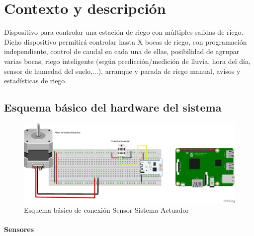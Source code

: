 \documentclass[12pt,a4paper,titlepage,oneside]{report}
\title{\titulo}
\author{\autor}
\begin{document}



\listoffigures

\chapter{Contexto y descripción}

	Dispositivo para controlar una estación de riego 
con múltiples salidas de riego. Dicho dispositivo 
permitirá controlar hasta X bocas de riego, con programación 
independiente, control de caudal en cada una de ellas, posibilidad 
de agrupar varias bocas, riego inteligente (según predicción/medición 
de lluvia, hora del día, sensor de humedad del suelo,...), arranque y
 parada de riego manual, avisos y estadísticas de riego. 

\section{Esquema básico del hardware del sistema}
	
	\begin{figure}
		\center
		\includegraphics[scale=0.5]{./images/Conexion.png}
		\caption{Esquema básico de conexión Sensor-Sistema-Actuador}
		\label{Esquema_basico}
	\end{figure}		
	
	\subsubsection*{Sensores}
\end{document}
